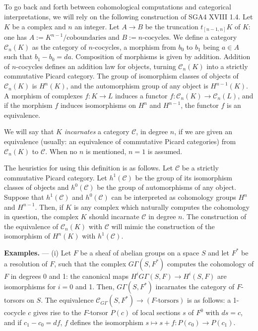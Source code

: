 \documentclass[11pt,a4paper]{article}
\theoremstyle{plain}
\theoremstyle{definition}
\newcommand{\cC}{\mathcal{C}}
\begin{document}
\subsection{}
To go back and forth between cohomological computations and categorical interpretations, we will rely on the following construction of SGA4 XVIII 1.4. Let $K$ be a complex and $n$ an integer. Let $A \to B$ be the truncation $t_{[n-1,n]}K$ of $K$: one has $A := K^{n-1}/\text{coboundaries}$ and $B := \text{$n$-cocycles}$. We define a category $\cC_n(K)$ as the category of $n$-cocycles, a morphism from $b_0$ to $b_1$ being $a \in A$ such that $b_1 - b_0 = da$. Composition of morphisms is given by addition. Addition of $n$-cocycles defines an addition law for objects, turning $\cC_n(K)$ into a strictly commutative Picard category. The group of isomorphism classes of objects of $\cC_n(K)$ is $H^n(K)$, and the automorphism group of any object is $H^{n-1}(K)$. A morphism of complexes $f: K \to L$ induces a functor $f: \cC_n(K) \to \cC_n(L)$, and if the morphism $f$ induces isomorphisms on $H^n$ and $H^{n-1}$, the functor $f$ is an equivalence.

We will say that $K$ \emph{incarnates} a category $\cC$, in degree $n$, if we are given an equivalence (usually: an equivalence of commutative Picard categories) from $\cC_n(K)$ to $\cC$. When no $n$ is mentioned, $n=1$ is assumed.

The heuristics for using this definition is as follows. Let $\cC$ be a strictly commutative Picard category. Let $h^1(\cC)$ be the group of its isomorphism classes of objects and $h^0(\cC)$ be the group of automorphisms of any object. Suppose that $h^1(\cC)$ and $h^0(\cC)$ can be interpreted as cohomology groups $H^n$ and $H^{n-1}$. Then, if $K$ is any complex which naturally computes the cohomology in question, the complex $K$ should incarnate $\cC$ in degree $n$. The construction of the equivalence of $\cC_n(K)$ with $\cC$ will mimic the construction of the isomorphism of $H^n(K)$ with $h^1(\cC)$.

\textbf{Examples.} --- (i) Let $F$ be a sheaf of abelian groups on a space $S$ and let $F^*$ be a resolution of $F$, such that the complex $G\Gamma(S, F^*)$ computes the cohomology of $F$ in degrees 0 and 1: the canonical maps $H^i G\Gamma(S, F) \to H^i(S, F)$ are isomorphisms for $i=0$ and 1. Then, $G\Gamma(S, F^*)$ incarnates the category of $F$-torsors on $S$. The equivalence $\cC_{G\Gamma}(S,F^*) \to (F\text{-torsors})$ is as follows: a 1-cocycle $c$ gives rise to the $F$-torsor $P(c)$ of local sections $s$ of $F^0$ with $ds=c$, and if $c_1 - c_0 = df$, $f$ defines the isomorphism $s \mapsto s+f: P(c_0) \to P(c_1)$.
\end{document}
